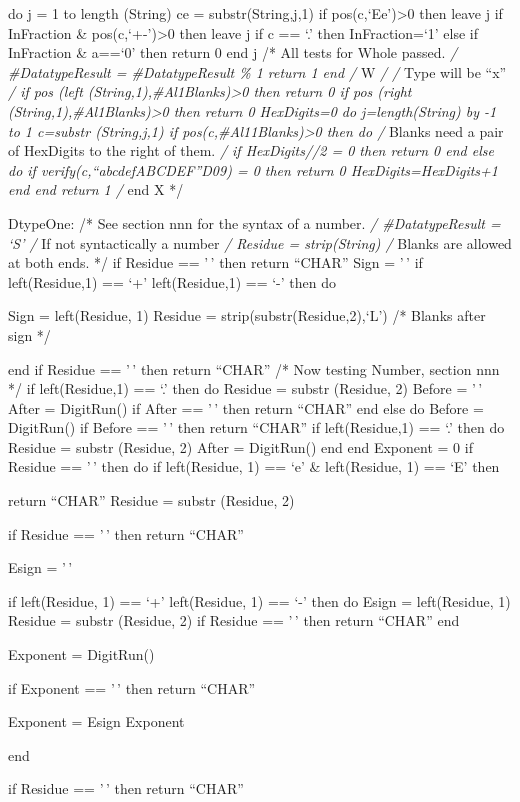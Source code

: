 do j = 1 to length (String) ce = substr(String,j,1) if
pos(c,`Ee')\textgreater0 then leave j if InFraction \&
pos(c,`+-')\textgreater0 then leave j if c == `.' then InFraction=`1'
else if InFraction \& a==`0' then return 0 end j /* All tests for Whole
passed. \emph{/ \#DatatypeResult = \#DatatypeResult \% 1 return 1 end /}
W \emph{/ /} Type will be ``x'' \emph{/ if pos (left
(String,1),\#Al1Blanks)\textgreater0 then return 0 if pos (right
(String,1),\#Al1Blanks)\textgreater0 then return 0 HexDigits=0 do
j=length(String) by -1 to 1 c=substr (String,j,1) if
pos(c,\#Al11Blanks)\textgreater0 then do /} Blanks need a pair of
HexDigits to the right of them. \emph{/ if HexDigits//2 = 0 then return
0 end else do if verify(c,``abcdefABCDEF''D09) = 0 then return 0
HexDigits=HexDigits+1 end end return 1 /} end X */

DtypeOne: /* See section nnn for the syntax of a number. \emph{/
\#DatatypeResult = `S' /} If not syntactically a number \emph{/ Residue
= strip(String) /} Blanks are allowed at both ends. */ if Residue ==
'\,' then return ``CHAR'' Sign = '\,' if left(Residue,1) == `+'
\textbar{} left(Residue,1) == `-' then do

Sign = left(Residue, 1) Residue = strip(substr(Residue,2),`L') /* Blanks
after sign */

end if Residue == '\,' then return ``CHAR'' /* Now testing Number,
section nnn */ if left(Residue,1) == `.' then do Residue = substr
(Residue, 2) Before = '\,' After = DigitRun() if After == '\,' then
return ``CHAR'' end else do Before = DigitRun() if Before == '\,' then
return ``CHAR'' if left(Residue,1) == `.' then do Residue = substr
(Residue, 2) After = DigitRun() end end Exponent = 0 if Residue == '\,'
then do if left(Residue, 1) == `e' \& left(Residue, 1) == `E' then

return ``CHAR'' Residue = substr (Residue, 2)

if Residue == '\,' then return ``CHAR''

Esign = '\,'

if left(Residue, 1) == `+' \textbar{} left(Residue, 1) == `-' then do
Esign = left(Residue, 1) Residue = substr (Residue, 2) if Residue ==
'\,' then return ``CHAR'' end

Exponent = DigitRun()

if Exponent == '\,' then return ``CHAR''

Exponent = Esign \textbar\textbar{} Exponent

end

if Residue == '\,' then return ``CHAR''

